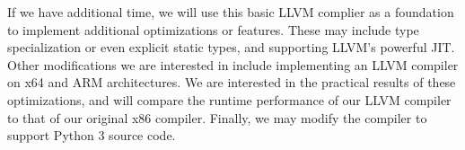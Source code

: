 \documentclass[11pt]{article}
\begin{document}
If we have additional time, we will use this basic LLVM complier as a
foundation to implement additional optimizations or features. These
may include type specialization or even explicit static types, and
supporting LLVM's powerful JIT. Other modifications we are interested
in include implementing an LLVM compiler on x64 and ARM
architectures. We are interested in the practical results of these
optimizations, and will compare the runtime performance of our LLVM
compiler to that of our original x86 compiler. Finally, we may modify
the compiler to support Python 3 source code. 



\nocite{*}
\printbibliography

\end{document}
